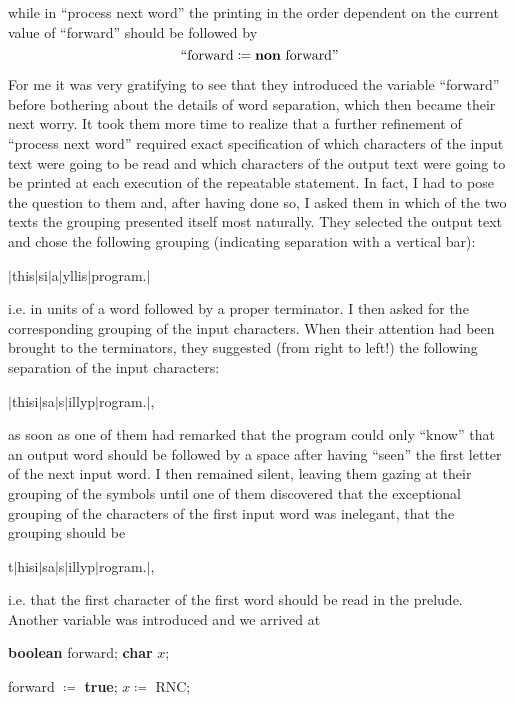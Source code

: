 \noindent
while in ``process next word'' the printing in the order dependent on the current value of ``forward'' should be followed by
$$
\text{``forward} \coloneq \text{\textbf{non} forward''}
$$

For me it was very gratifying to see that they introduced the variable ``forward'' before bothering about the details of word separation, which then became their next worry. It took them more time to realize that a further refinement of ``process next word'' required exact specification of which characters of the input text were going to be read and which characters of the output text were going to be printed at each execution of the repeatable statement. In fact, I had to pose the question to them and, after having done so, I asked them in which of the two texts the grouping presented itself most naturally. They selected the output text and chose the following grouping (indicating separation with a vertical bar):

\quad $\mid$this\textendash $\mid$si\textendash $\mid$a\textendash $\mid$yllis\textendash $\mid$program.$\mid$

\noindent
i.e. in units of a word followed by a proper terminator. I then asked for the corresponding grouping of the input characters. When their attention had been brought to the terminators, they suggested (from right to left!) the following separation of the input characters:

\quad $\mid$this\textemdash{}i$\mid$s\textemdash{}a$\mid$\textemdash{}s$\mid$illy\textemdash{}p$\mid$rogram\textemdash{}.$\mid$,

\noindent
as soon as one of them had remarked that the program could only ``know'' that an output word should be followed by a space after having ``seen'' the first letter of the next input word. I then remained silent, leaving them gazing at their grouping of the symbols until one of them discovered that the exceptional grouping of the characters of the first input word was inelegant, that the grouping should be

\quad t$\mid$his\textemdash{}i$\mid$s\textemdash{}a$\mid$\textemdash{}s$\mid$illy\textemdash{}p$\mid$rogram\textemdash{}.$\mid$,

\noindent
i.e. that the first character of the first word should be read in the prelude. Another variable was introduced and we arrived at

\quad \textbf{boolean} forward; \textbf{char} $x$;

\quad forward $\coloneq$ \textbf{true}; $x \coloneq$ RNC;


